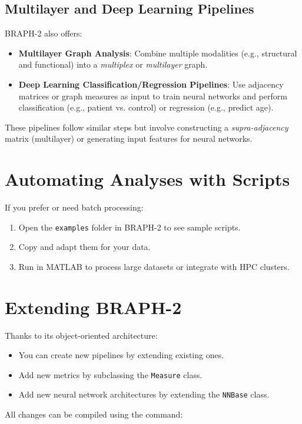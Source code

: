\documentclass[justified]{tufte-handout}
\begin{document}
\subsection{Multilayer and Deep Learning Pipelines}

BRAPH-2 also offers:
\begin{itemize}

\item \textbf{Multilayer Graph Analysis}: Combine multiple modalities (e.g., structural and functional) into a \textit{multiplex} or \textit{multilayer} graph.

\item \textbf{Deep Learning Classification/Regression Pipelines}: Use adjacency matrices or graph measures as input to train neural networks and perform classification (e.g., patient vs. control) or regression (e.g., predict age).

\end{itemize}
These pipelines follow similar steps but involve constructing a \textit{supra-adjacency} matrix (multilayer) or generating input features for neural networks.

\section{Automating Analyses with Scripts}

If you prefer or need batch processing:
\begin{enumerate}

\item Open the \texttt{examples} folder in BRAPH-2 to see sample scripts.

\item Copy and adapt them for your data.  

\item Run in MATLAB to process large datasets or integrate with HPC clusters.

\end{enumerate}

\section{Extending BRAPH-2}

Thanks to its object-oriented architecture:
\begin{itemize}

\item You can create new pipelines by extending existing ones.

\item Add new metrics by subclassing the \texttt{Measure} class.

\item Add new neural network architectures by extending the \texttt{NNBase} class.

\end{itemize}
All changes can be compiled using the command:
\end{document}
